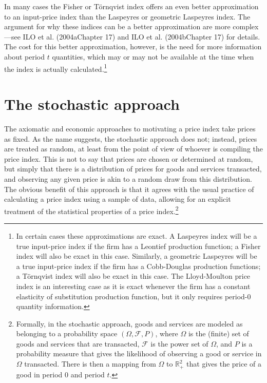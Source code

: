 \documentclass[
]{article}
\begin{document}
In many cases the Fisher or Törnqvist index offers an even better approximation to an input-price index than the Laspeyres or geometric Laspeyres index. The argument for why these indices can be a better approximation are more complex---see ILO et al. (2004aChapter 17) and ILO et al. (2004bChapter 17) for details. The cost for this better approximation, however, is the need for more information about period \(t\) quantities, which may or may not be available at the time when the index is actually calculated.\footnote{In certain cases these approximations are exact. A Laspeyres index will be a true input-price index if the firm has a Leontief production function; a Fisher index will also be exact in this case. Similarly, a geometric Laspeyres will be a true input-price index if the firm has a Cobb-Douglas production functions; a Törnqvist index will also be exact in this case. The Lloyd-Moulton price index is an interesting case as it is exact whenever the firm has a constant elasticity of substitution production function, but it only requires period-0 quantity information.}

\hypertarget{the-stochastic-approach}{%
\section{The stochastic approach}\label{the-stochastic-approach}}

The axiomatic and economic approaches to motivating a price index take prices as fixed. As the name suggests, the stochastic approach does not; instead, prices are treated as random, at least from the point of view of whoever is compiling the price index. This is not to say that prices are chosen or determined at random, but simply that there is a distribution of prices for goods and services transacted, and observing any given price is akin to a random draw from this distribution. The obvious benefit of this approach is that it agrees with the usual practice of calculating a price index using a sample of data, allowing for an explicit treatment of the statistical properties of a price index.\footnote{Formally, in the stochastic approach, goods and services are modeled as belonging to a probability space \((\Omega, \mathcal{F}, P)\), where \(\Omega\) is the (finite) set of goods and services that are transacted, \(\mathcal{F}\) is the power set of \(\Omega\), and \(P\) is a probability measure that gives the likelihood of observing a good or service in \(\Omega\) transacted. There is then a mapping from \(\Omega\) to \(\mathbb{R}_{+}^{2}\) that gives the price of a good in period 0 and period \(t\).}
\end{document}
